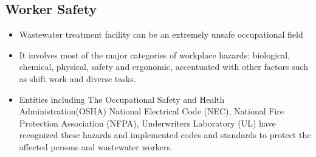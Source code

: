\documentclass{article}
\begin{document}
\subsection{Worker Safety}
\begin{itemize}
\item Wastewater treatment facility can be an extremely unsafe occupational field
\item It involves most of the major categories of workplace hazards:  biological, chemical, physical, safety and ergonomic,  accentuated with other factors such as shift work and diverse tasks.
\item Entities including The Occupational Safety and Health Administration(OSHA) National Electrical Code (NEC), National Fire Protection Association (NFPA), Underwriters Laboratory (UL) have recognized these hazards and implemented codes and standards to protect the affected persons and wastewater workers.
\end{itemize}
\end{document}
